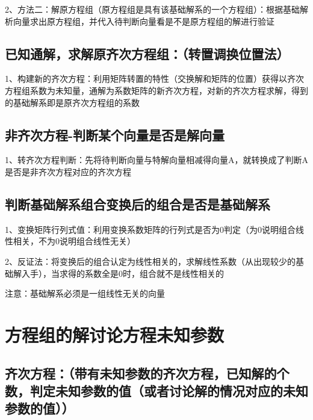 2、方法二：解原方程组（原方程组是具有该基础解系的一个方程组）：根据基础解析向量求出原方程组，并代入待判断向量看是不是原方程组的解进行验证



\subsection{已知通解，求解原齐次方程组：（转置调换位置法）}

1、构建新的齐次方程：利用矩阵转置的特性（交换解和矩阵的位置）获得以齐次方程组系数为未知量，通解为系数矩阵的新齐次方程，对新的齐次方程求解，得到的基础解系即是原齐次方程组的系数



\subsection{非齐次方程-判断某个向量是否是解向量}

1、转齐次方程判断：先将待判断向量与特解向量相减得向量A，就转换成了判断A是否是非齐次方程对应的齐次方程



\subsection{判断基础解系组合变换后的组合是否是基础解系}

1、变换矩阵行列式值：利用变换系数矩阵的行列式是否为0判定（为0说明组合线性相关，不为0说明组合线性无关）

2、反证法：将变换后的组合认定为线性相关的，求解线性系数（从出现较少的基础解入手），当求得的系数全是0时，组合就不是线性相关的

注意：基础解系必须是一组线性无关的向量

\section{方程组的解讨论方程未知参数}



\subsection{齐次方程：（带有未知参数的齐次方程，已知解的个数，判定未知参数的值（或者讨论解的情况对应的未知参数的值））}

